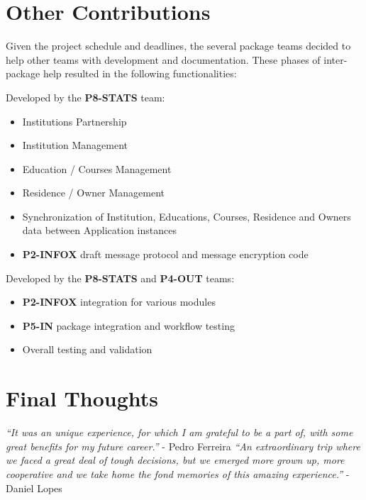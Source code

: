 \section{Other Contributions}
Given the project schedule and deadlines, the several package teams decided to
help other teams with development and documentation. These phases of
inter-package help resulted in the following functionalities:



Developed by the \textbf{P8-STATS} team:
\begin{itemize}
  \item Institutions Partnership
  \item Institution Management
  \item Education / Courses Management
  \item Residence / Owner Management
  \item Synchronization of Institution, Educations, Courses, Residence and
  Owners data between Application instances
  \item \textbf{P2-INFOX} draft message protocol and message encryption code
\end{itemize}


Developed by the \textbf{P8-STATS} and \textbf{P4-OUT} teams:
\begin{itemize}
  \item \textbf{P2-INFOX} integration for various modules
  \item \textbf{P5-IN} package integration and workflow testing
  \item Overall testing and validation
\end{itemize}

\section{Final Thoughts}
\textit{“It was an unique experience, for which I am grateful to be a part of,
with some great benefits for my future career.”} - Pedro Ferreira
\newline \newline
\textit{“An extraordinary trip where we faced a great deal of tough decisions,
but we emerged more grown up, more cooperative and we take home the fond
memories of this amazing experience.”} - Daniel Lopes
